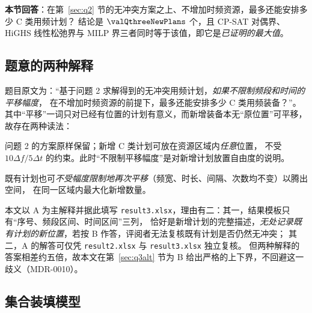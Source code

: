 \noindent\textbf{本节回答}：在第~\ref{sec:q2} 节的无冲突方案之上、不增加时频资源，最多还能安排多少 C 类用频计划？
结论是 $\valQthreeNewPlans$ 个，且 CP-SAT 对偶界、HiGHS 线性松弛界与 MILP 界三者同时等于该值，即它是\emph{已证明的最大值}。

\subsection{题意的两种解释}

题目原文为：“基于问题 2 求解得到的无冲突用频计划，\emph{如果不限制频段和时间的平移幅度}，
在不增加时频资源的前提下，最多还能安排多少 C 类用频装备？”。
其中“平移”一词只对已经有位置的计划有意义，而新增装备本无“原位置”可平移，故存在两种读法：

\begin{description}[leftmargin=0em,itemsep=0.2em,font=\normalfont\bfseries]
  \item[解释 A（主解释）] 问题 2 的方案原样保留；新增 C 类计划可放在资源区域内\emph{任意}位置，
        不受 $10\Delta f/5\Delta t$ 的约束。此时“不限制平移幅度”是对新增计划放置自由度的说明。
  \item[解释 B] 既有计划也可\emph{不受幅度限制地再次平移}（频宽、时长、间隔、次数均不变）以腾出空间，
        在同一区域内最大化新增数量。
\end{description}

本文以 A 为主解释并据此填写 \nolinkurl{result3.xlsx}，理由有二：其一，结果模板只有“序号、频段区间、时间区间”三列，
恰好是新增计划的完整描述，\emph{无处记录既有计划的新位置}，若按 B 作答，评阅者无法复核既有计划是否仍然无冲突；
其二，A 的解答可仅凭 \nolinkurl{result2.xlsx} 与 \nolinkurl{result3.xlsx} 独立复核。
但两种解释的答案相差约五倍，故本文在第~\ref{sec:q3alt} 节为 B 给出严格的上下界，不回避这一歧义（MDR-0010）。

\subsection{集合装填模型}

